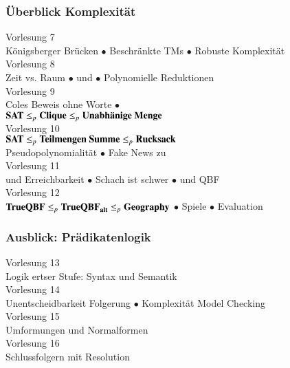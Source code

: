 \documentclass[onlymath]{beamer}
\begin{document}
\begin{frame}\frametitle{Überblick Komplexität}

\begin{center}
\alert{Vorlesung 7}\\
Königsberger Brücken $\bullet$ Beschränkte TMs $\bullet$ Robuste Komplexität\\[1ex]
\alert{Vorlesung 8}\\
Zeit vs. Raum $\bullet$  und   $\bullet$ Polynomielle Reduktionen \\[1ex]
\alert{Vorlesung 9}\\
Coles Beweis ohne Worte $\bullet$ \\$\textbf{\textcolor{black}{SAT}}\leq_p \textbf{\textcolor{black}{Clique}}\leq_p \textbf{\textcolor{black}{Unabhänige Menge}}$ \\[1ex]
\alert{Vorlesung 10}\\
$\textbf{\textcolor{black}{SAT}}\leq_p \textbf{\textcolor{black}{Teilmengen Summe}}\leq_p \textbf{\textcolor{black}{Rucksack}}$ \\Pseudopolynomialität $\bullet$ Fake News zu  \\[1ex]
\alert{Vorlesung 11}\\
 und Erreichbarkeit $\bullet$ Schach ist schwer $\bullet$ \PSpace und QBF \\[1ex]
\alert{Vorlesung 12}\\
$\textbf{\textcolor{black}{TrueQBF}}\leq_p \textbf{\textcolor{black}{TrueQBF}}_{\textbf{\textcolor{black}{alt}}}\leq_p \textbf{\textcolor{black}{Geography}}$ $\bullet$ Spiele $\bullet$ Evaluation
\end{center}

\end{frame}

\begin{frame}\frametitle{Ausblick: Prädikatenlogik}

\begin{center}
\alert{Vorlesung 13}\\
Logik ertser Stufe: Syntax und Semantik\\[1ex]
\alert{Vorlesung 14}\\
Unentscheidbarkeit Folgerung $\bullet$ Komplexität Model Checking \\[1ex]
\alert{Vorlesung 15}\\
Umformungen und Normalformen \\[1ex]
\alert{Vorlesung 16}\\
Schlussfolgern mit Resolution
\end{center}

\end{frame}
\end{document}
